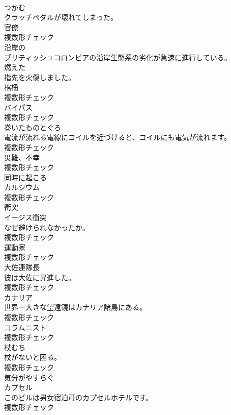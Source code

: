\documentclass[8pt]{extreport}
\begin{document}
\begin{CJK}{UTF8}{min}
\\	[動詞]	つかむ	
\\	クラッチペダルが壊れてしまった。	
\\	[名詞]	官僚	
\\	複数形チェック
\\	[形容詞]	沿岸の	
\\	ブリティッシュコロンビアの沿岸生態系の劣化が急速に進行している。	
\\	[形容詞]	燃えた	
\\	指先を火傷しました。	
\\	[名詞]	棺桶	
\\	複数形チェック
\\	[名詞]	バイパス	
\\	複数形チェック
\\	[名詞]	巻いたものとぐろ	
\\	電流が流れる電線にコイルを近づけると、コイルにも電気が流れます。	
\\	複数形チェック
\\	[名詞]	災難、不幸	
\\	複数形チェック
\\	[動詞]	同時に起こる	
\\	[名詞]	カルシウム	
\\	複数形チェック
\\	[名詞]	衝突	
\\	イージス衝突 
\\	なぜ避けられなかったか。	
\\	複数形チェック
\\	[名詞]	運動家	
\\	複数形チェック
\\	[名詞]	大佐連隊⻑	
\\	彼は大佐に昇進した。	
\\	複数形チェック
\\	[名詞]	カナリア	
\\	世界一大きな望遠鏡はカナリア諸島にある。	
\\	複数形チェック
\\	[名詞]	コラムニスト	
\\	複数形チェック
\\	[名詞]	杖むち	
\\	杖がないと困る。	
\\	複数形チェック
\\	[形容詞]	気分がやすらぐ	
\\	[名詞]	カプセル	
\\	このビルは男女宿泊可のカプセルホテルです。	
\\	複数形チェック

\end{CJK}
\end{document}
